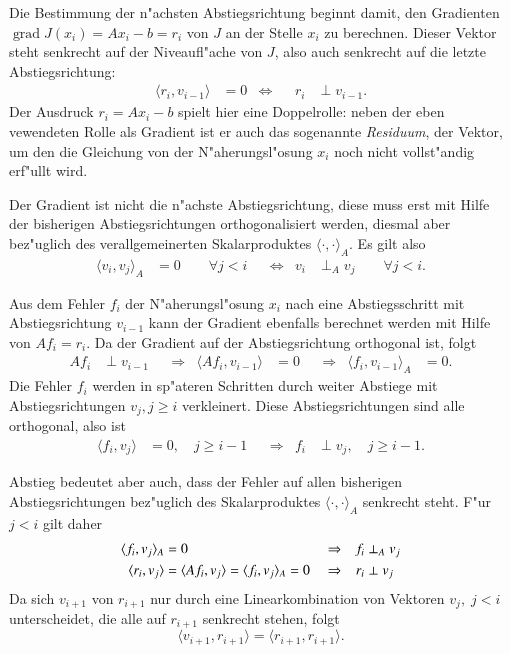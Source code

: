 Die Bestimmung der n"achsten Abstiegsrichtung beginnt damit, den Gradienten
$\operatorname{grad}J(x_i)=Ax_i-b=r_i$
von $J$ an der Stelle $x_i$ zu berechnen. Dieser Vektor steht
senkrecht auf der Niveaufl"ache von $J$, also auch senkrecht auf die
letzte Abstiegsrichtung:
\begin{align}
\langle r_i,v_{i-1}\rangle &= 0
&\Leftrightarrow&&
r_i&\perp v_{i-1}.
\label{descent:rorthogonal}
\end{align}
Der Ausdruck $r_i=Ax_i-b$ spielt hier eine Doppelrolle: neben der eben
vewendeten Rolle als Gradient ist er auch das sogenannte {\em Residuum},
der Vektor, um den die Gleichung von der N"aherungsl"osung $x_i$
noch nicht vollst"andig erf"ullt wird.

Der Gradient ist nicht die n"achste Abstiegsrichtung, diese muss erst
mit Hilfe der bisherigen Abstiegsrichtungen orthogonalisiert werden,
diesmal aber bez"uglich des verallgemeinerten Skalarproduktes
$\langle\cdot,\cdot\rangle_A$. Es gilt also
\begin{align}
\langle v_i,v_j\rangle_A&=0\qquad\forall j < i
&&\Leftrightarrow&
v_i&\perp_A v_j\qquad\forall j< i.
\label{descent:vorthogonalA}
\end{align}

Aus dem Fehler $f_i$ der N"aherungsl"osung $x_i$ nach eine Abstiegsschritt
mit Abstiegsrichtung $v_{i-1}$ kann der Gradient ebenfalls berechnet werden
mit Hilfe von $Af_i=r_i$.
Da der Gradient auf der Abstiegsrichtung orthogonal ist, folgt
\begin{align}
Af_i&\perp v_{i-1}
&&\Rightarrow&
\langle Af_i,v_{i-1}\rangle&=0
&&\Rightarrow&
\langle f_i,v_{i-1}\rangle_A&=0.
\end{align}
Die Fehler $f_i$ werden in sp"ateren Schritten durch weiter Abstiege
mit Abstiegsrichtungen $v_j, j\ge i$ verkleinert.
Diese Abstiegsrichtungen sind alle orthogonal, also ist
\begin{align*}
\langle f_i,v_j\rangle&=0,\quad j\ge i-1
&&\Rightarrow&
f_i&\perp v_j,\quad j\ge i-1.
\end{align*}

Abstieg bedeutet aber auch, dass der Fehler auf allen bisherigen
Abstiegsrichtungen bez"uglich des Skalarproduktes
$\langle\cdot,\cdot\rangle_A$ senkrecht steht.
F"ur $j<i$ gilt daher
\begin{align}
\langle f_i,v_j\rangle_A&=0
&&\Rightarrow&
f_i&\perp_A v_j
\notag
\\
\langle r_i,v_j\rangle
&=\langle Af_i,v_j\rangle
=\langle f_i,v_j\rangle_A=0
&&\Rightarrow&
r_i&\perp v_j
\label{cg:rvperp}
\end{align}
Da sich $v_{i+1}$ von $r_{i+1}$ nur durch eine Linearkombination von Vektoren
$v_j,\;j < i$ unterscheidet, die alle auf $r_{i+1}$ senkrecht stehen, folgt
\[
\langle v_{i+1},r_{i+1}\rangle
=
\langle r_{i+1},r_{i+1}\rangle.
\]

